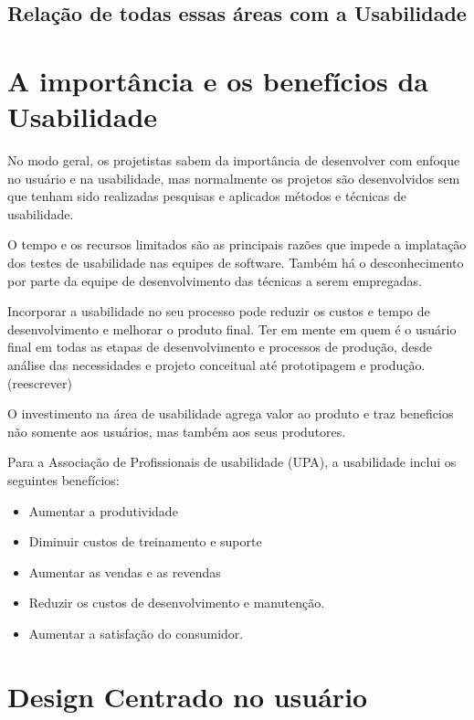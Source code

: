 
\subsection{Relação de todas essas áreas com a Usabilidade}

\section{A importância e os benefícios da Usabilidade}

No modo geral, os projetistas sabem da importância de desenvolver com enfoque no usuário e na usabilidade, mas normalmente os projetos são desenvolvidos sem que tenham sido realizadas pesquisas e aplicados métodos e técnicas de usabilidade.
	
	O tempo e os recursos limitados são as principais razões que impede a implatação dos testes de usabilidade nas equipes de software. Também há o desconhecimento por parte da equipe de desenvolvimento das técnicas a serem empregadas.

Incorporar a usabilidade no seu processo pode reduzir os custos e tempo de desenvolvimento e melhorar o produto final. Ter em mente  em quem é o usuário final em todas as etapas de desenvolvimento e processos de produção, desde análise das necessidades e projeto conceitual até prototipagem e produção.  (reescrever)

	O investimento na área de usabilidade agrega valor ao produto e traz beneficios não somente aos usuários, mas também aos seus produtores. 

Para a Associação de Profissionais de usabilidade (UPA), a usabilidade inclui os seguintes benefícios:

\begin{itemize}
\item Aumentar a produtividade
\item Diminuir custos de treinamento e suporte
\item Aumentar as vendas e as revendas
\item Reduzir os custos de desenvolvimento e manutenção.
\item Aumentar a satisfação do consumidor.
\end{itemize}


\section{Design Centrado no usuário}

